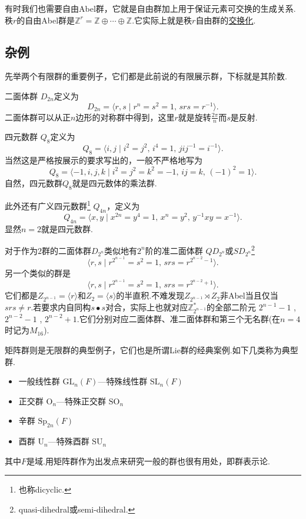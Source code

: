 \begin{remark}
	有时我们也需要{\heiti 自由Abel群}，它就是自由群加上用于保证元素可交换的生成关系.秩$r$的自由Abel群是$\mathbb{Z}^{r}=\mathbb{Z}\oplus\cdots\oplus\mathbb{Z}$.它实际上就是秩$r$自由群的\hyperlink{text:Abelianization}{交换化}.
\end{remark}
\subsection{杂例}
先举两个有限群的重要例子，它们都是此前说的有限展示群，下标就是其阶数.

{\heiti 二面体群} $D_{2n}$定义为
\[
	D_{2n}=\langle r,s\mid r^n=s^2=1,\,srs=r^{-1}\rangle .
\]
二面体群可以从正$n$边形的对称群中得到，这里$r$就是旋转$\frac{2\pi}{n}$而$s$是反射.

{\heiti 四元数群} $Q_8$定义为
\[
	Q_8=\langle i,j\mid i^2=j^2,\,i^4=1,\,jij^{-1}=i^{-1}\rangle .
\]
当然这是严格按展示的要求写出的，一般不严格地写为
\[
	Q_8=\langle -1,i,j,k\mid i^2=j^2=k^2=-1,\,ij=k,\,(-1)^2=1\rangle .
\]
自然，四元数群$Q_8$就是四元数体的乘法群.
\begin{remark}
	此外还有{\heiti 广义四元数群}\footnote{也称dicyclic.} $Q_{4n}$，定义为
	\[
		Q_{4n}=\langle x,y\mid x^{2n}=y^4=1,\,x^n=y^2,\,y^{-1}xy=x^{-1}\rangle .
	\]
	显然$n=2$就是四元数群.

	对于作为$2$群的二面体群$D_{2^n}$类似地有$2^n$阶的{\heiti 准二面体群} $QD_{2^n}$或$SD_{2^n}$\footnote{quasi-dihedral或semi-dihedral.}
	\[
		\langle r,s\mid r^{2^{n-1}}=s^2=1,\,srs=r^{2^{n-2}-1}\rangle .
	\]
	另一个类似的群是
	\[
		\langle r,s\mid r^{2^{n-1}}=s^2=1,\,srs=r^{2^{n-2}+1}\rangle .
	\]
	它们都是$Z_{2^{n-1}}=\langle r\rangle $和$Z_2=\langle s\rangle $的半直积.不难发现$Z_{2^{n-1}}\rtimes Z_2$非Abel当且仅当$srs\ne r$.若要求内自同构$s\bullet s$对合，实际上也就对应$\mathbb{Z}_{2^{n-1}}^*$的全部二阶元 $2^{n-1}-1$ , $2^{n-2}-1$ , $2^{n-2}+1$.它们分别对应二面体群、准二面体群和第三个无名群(在$n=4$时记为$M_{16}$).
\end{remark}

{\heiti 矩阵群}则是无限群的典型例子，它们也是所谓Lie群的经典案例.如下几类称为{\heiti 典型群}.
\begin{itemize}
	\item {\heiti 一般线性群} $\mathrm{GL}_n(F)$\quad ---{\heiti 特殊线性群} $\mathrm{SL}_n(F)$
	\item {\heiti 正交群} $\mathrm{O}_n$\quad ---{\heiti 特殊正交群} $\mathrm{SO}_n$
	\item {\heiti 辛群} $\mathrm{Sp}_{2n}(F)$
	\item {\heiti 酉群} $\mathrm{U}_n$\quad ---{\heiti 特殊酉群} $\mathrm{SU}_n$
\end{itemize}
其中$F$是域.用矩阵群作为出发点来研究一般的群也很有用处，即群表示论.

